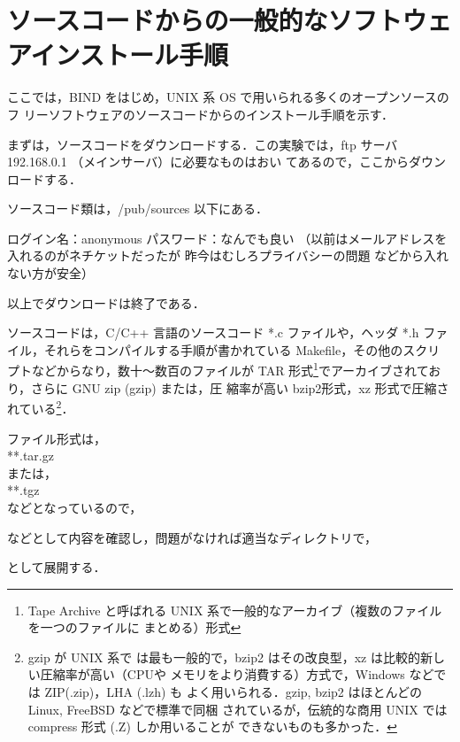 \section{ソースコードからの一般的なソフトウェアインストール手順}

ここでは，BIND をはじめ，UNIX 系 OS で用いられる多くのオープンソースのフ
リーソフトウェアのソースコードからのインストール手順を示す．

まずは，ソースコードをダウンロードする．この実験では，ftp サーバ 192.168.0.1 （メインサーバ）に必要なものはおい
てあるので，ここからダウンロードする．

ソースコード類は，/pub/sources 以下にある．

\begin{cli}
 ログイン名：anonymous
 パスワード：なんでも良い
      （以前はメールアドレスを入れるのがネチケットだったが
        昨今はむしろプライバシーの問題
        などから入れない方が安全）
\end{cli}

以上でダウンロードは終了である．

ソースコードは，C/C++ 言語のソースコード *.c ファイルや，ヘッダ *.h ファ
イル，それらをコンパイルする手順が書かれている Makefile，その他のスクリ
プトなどからなり，数十〜数百のファイルが TAR 形式\footnote{Tape Archive 
と呼ばれる UNIX 系で一般的なアーカイブ（複数のファイルを一つのファイルに
まとめる）形式}でアーカイブされており，さらに GNU zip (gzip) または，圧
縮率が高い bzip2形式，xz 形式で圧縮されている\footnote{gzip が UNIX 系で
は最も一般的で，bzip2 はその改良型，xz は比較的新しい圧縮率が高い（CPUや
メモリをより消費する）方式で，Windows などでは ZIP(.zip)，LHA (.lzh) も
よく用いられる．gzip, bzip2 はほとんどの Linux, FreeBSD などで標準で同梱
されているが，伝統的な商用 UNIX では compress 形式 (.Z) しか用いることが
できないものも多かった．}．

ファイル形式は，\\
**.tar.gz\\
または，\\
**.tgz\\
などとなっているので，

\begin{cli}
\end{cli}
などとして内容を確認し，問題がなければ適当なディレクトリで，
\begin{cli}
\end{cli}
として展開する．

